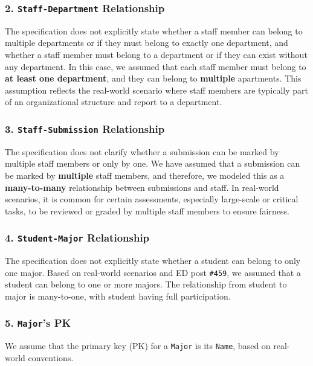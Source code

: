 \documentclass[12pt]{article}
\begin{document}
\subsubsection*{2. \texttt{Staff-Department} Relationship}
The specification does not explicitly state whether a staff member can belong to multiple departments or if they must belong to exactly one department, and whether a staff member must belong to a department or if they can exist without any department. In this case, we assumed that each staff member must belong to \textbf{at least one department}, and they can belong to \textbf{multiple} apartments. This assumption reflects the real-world scenario where staff members are typically part of an organizational structure and report to a department.

\subsubsection*{3. \texttt{Staff-Submission} Relationship}
The specification does not clarify whether a submission can be marked by multiple staff members or only by one. We have assumed that a submission can be marked by \textbf{multiple} staff members, and therefore, we modeled this as a \textbf{many-to-many} relationship between submissions and staff. In real-world scenarios, it is common for certain assessments, especially large-scale or critical tasks, to be reviewed or graded by multiple staff members to ensure fairness.

\subsubsection*{4. \texttt{Student-Major} Relationship}

The specification does not explicitly state whether a student can belong to only one major. Based on real-world scenarios and ED post \texttt{\#459}, we assumed that a student can belong to one or more majors. The relationship from student to major is many-to-one, with student having full participation.

\subsubsection*{5. \texttt{Major}'s PK}
We assume that the primary key (PK) for a \texttt{Major} is its \texttt{Name}, based on real-world conventions.
\end{document}
